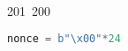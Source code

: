 201~200~\documentclass{article}
\begin{document}
\begin{lstlisting}[language=Python, caption=Cracking the key for Chall 2]
	                                                                        	                                                                    	                                	                    	                    	                        	                        	                    	                                                                	                	                                                                    	                    							                                                                                                                                                                                                    		            nonce = b"\x00"*24
	                                                                        	                                                                    	                                	                    	                    	                        	                        	                    	                                                                	                	                                                                    	                    							                                                                                                                                                                                                    		                i = 0


\end{lstlisting}
\end{document}
